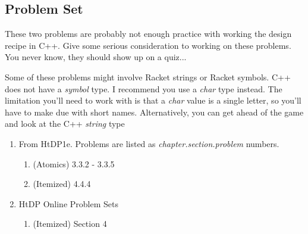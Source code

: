 \documentclass[]{tufte-handout}
\begin{document}
\subsection{Problem Set}

These two problems are probably not enough practice with working the design recipe in C++.  Give some serious consideration to working on these problems. You never know, they should show up on a quiz...

Some of these problems might involve Racket strings or Racket symbols. C++ does not have a \textit{symbol} type.  I recommend you use a \textit{char} type instead.  The limitation you'll need to work with is that a \textit{char} value is a single letter, so you'll have to make due with short names.  Alternatively, you can get ahead of the game and look at the C++ \textit{string} type
\begin{enumerate}
\item From HtDP1e. Problems are listed as \textit{chapter.section.problem} numbers.
\begin{enumerate}
\item (Atomics) 3.3.2 - 3.3.5
\item (Itemized) 4.4.4
\end{enumerate}
\item HtDP Online Problem Sets
\begin{enumerate}
\item (Itemized) Section 4
\end{enumerate}
\end{enumerate}
\end{document}
